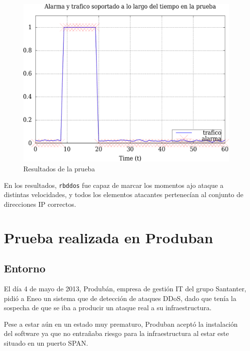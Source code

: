 \begin{figure}[htbp]
\centering
\includegraphics[width=\textwidth]{CapituloPruebas/Figuras/pruebaTrafico-crop}
\caption{Resultados de la prueba}
\end{figure}
%

En los resultados, \texttt{rbddos} fue capaz de marcar los momentos ajo ataque a distintas velocidades, y todos los 
elementos atacantes pertenecían al conjunto de direcciones IP correctos.

\section{Prueba realizada en Produban}
\subsection{Entorno}
El día 4 de mayo de 2013, Produbán, empresa de gestión IT del grupo Santanter, pidió a Eneo un sistema que de detección 
de ataques \gls{DDoS}, dado que tenía la sospecha de que se iba a producir un ataque real a su infraestructura.

Pese a estar aún en un estado muy prematuro, Produban aceptó la instalación del software ya que no entrañaba riesgo 
para la infraestructura al estar este situado en un puerto SPAN.

